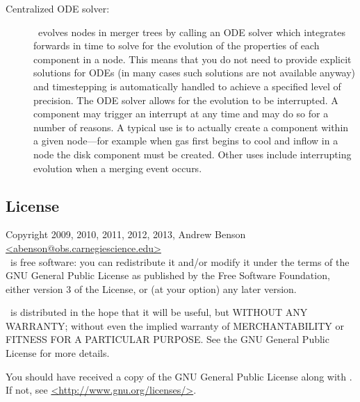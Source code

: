 \begin{description}
 \item [Centralized ODE solver:] \glc\ evolves nodes in merger trees by calling an ODE solver which integrates forwards in time to solve for the evolution of the properties of each component in a node. This means that you do not need to provide explicit solutions for ODEs (in many cases such solutions are not available anyway) and timestepping is automatically handled to achieve a specified level of precision. The ODE solver allows for the evolution to be interrupted. A component may trigger an interrupt at any time and may do so for a number of reasons. A typical use is to actually create a component within a given node---for example when gas first begins to cool and inflow in a node the disk component must be created. Other uses include interrupting evolution when a merging event occurs.
\end{description}

\subsection{License}

Copyright 2009, 2010, 2011, 2012, 2013, Andrew Benson \href{mailto:abenson@obs.carnegiescience.edu}{\normalfont \ttfamily <abenson@obs.carnegiescience.edu>}\\

\glc\ is free software: you can redistribute it and/or modify
it under the terms of the GNU General Public License as published by
the Free Software Foundation, either version 3 of the License, or
(at your option) any later version.

\glc\ is distributed in the hope that it will be useful,
but WITHOUT ANY WARRANTY; without even the implied warranty of
MERCHANTABILITY or FITNESS FOR A PARTICULAR PURPOSE.  See the
GNU General Public License for more details.

You should have received a copy of the GNU General Public License
along with \glc.  If not, see \href{http://www.gnu.org/licenses/}{\normalfont \ttfamily <http://www.gnu.org/licenses/>}.

